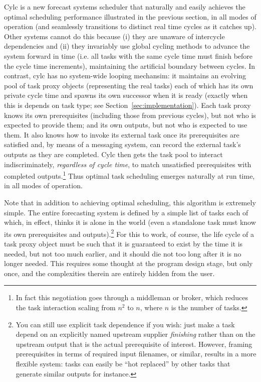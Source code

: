 \documentclass[11pt,a4paper]{article}
\begin{document}
Cylc is a new forecast systems scheduler that naturally and easily
achieves the optimal scheduling performance illustrated in the previous
section, in all modes of operation (and seamlessly transitions to
distinct real time cycles as it catches up).  Other systems cannot do
this because (i) they are unaware of intercycle dependencies and (ii)
they invariably use global cycling methods to advance the system forward
in time (i.e. all tasks with the same cycle time must finish before the
cycle time increments), maintaining the artificial boundary between
cycles. In contrast, cylc has no system-wide looping mechansim: it
maintains an evolving pool of task proxy objects (representing the real
tasks) each of which has its own private cycle time and spawns its own
successor when it is ready (exactly when this is depends on task type;
see Section~\ref{sec:implementation}). Each task proxy knows its own
prerequisites (including those from previous cycles), but not who is
expected to provide them; and its own outputs, but not who is expected
to use them. It also knows how to invoke its external task once its
prerequisites are satisfied and, by means of a messaging system, can
record the external task's outputs as they are completed. Cylc then gets
the task pool to interact indiscriminately, {\em regardless of cycle
time}, to match unsatisfied prerequisites with completed
outputs.\footnote{In fact this negotiation goes through a middleman or
broker, which reduces the task interaction scaling from $n^2$ to $n$,
where $n$ is the number of tasks.} Thus optimal task scheduling emerges
naturally at run time, in all modes of operation.

Note that in addition to achieving optimal scheduling, this algorithm is
extremely simple. The entire forecasting system is defined by a simple
list of tasks each of which, in effect, thinks it is alone in the world
(even a standalone task must know its own prerequisites and
outputs).\footnote{You can still use explicit task dependence if you
wish: just make a task depend on an explicitly named upstream supplier
{\em finishing} rather than on the upstream output that is the actual
prerequisite of interest. However, framing prerequisites in terms of
required input filenames, or similar, results in a more flexible system:
tasks can easily be ``hot replaced'' by other tasks that generate
similar outputs for instance.}  For this to work, of course, the life
cycle of a task proxy object must be such that it is guaranteed to exist
by the time it is needed, but not too much earlier, and it should die
not too long after it is no longer needed.  This requires some thought
at the program design stage, but only once, and the complexities therein
are entirely hidden from the user. 
\end{document}
